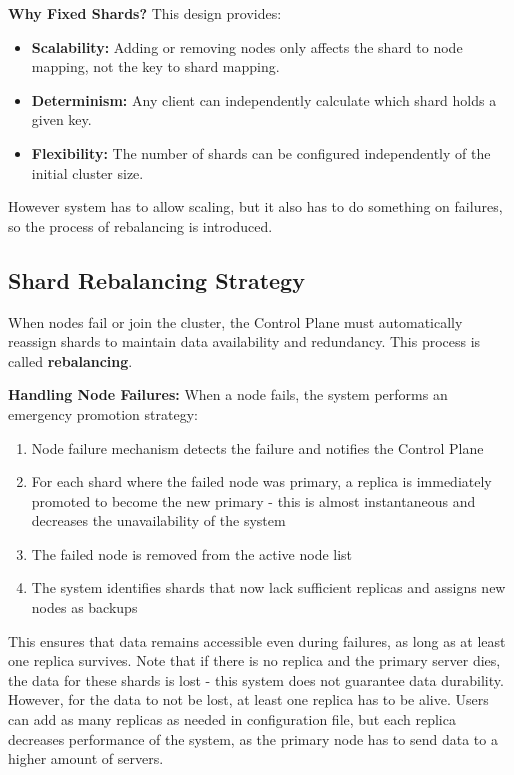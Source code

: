 \documentclass[shortabstract]{iithesis}
\begin{document}
\textbf{Why Fixed Shards?} This design provides:
\begin{itemize}
    \item \textbf{Scalability:} Adding or removing nodes only affects the shard to node mapping, not the key to shard mapping.
    \item \textbf{Determinism:} Any client can independently calculate which shard holds a given key.
    \item \textbf{Flexibility:} The number of shards can be configured independently of the initial cluster size.
\end{itemize}

However system has to allow scaling, but it also has to do something on failures, so the process of rebalancing is introduced.

\subsection{Shard Rebalancing Strategy}

When nodes fail or join the cluster, the Control Plane must automatically reassign shards to maintain data availability and redundancy. This process is called \textbf{rebalancing}.

\textbf{Handling Node Failures:} When a node fails, the system performs an emergency promotion strategy:
\begin{enumerate}
    \item Node failure mechanism detects the failure and notifies the Control Plane
    \item For each shard where the failed node was primary, a replica is immediately promoted to become the new primary - this is almost instantaneous and decreases the unavailability of the system
    \item The failed node is removed from the active node list
    \item The system identifies shards that now lack sufficient replicas and assigns new nodes as backups
\end{enumerate}

This ensures that data remains accessible even during failures, as long as at least one replica survives. Note that if there is no replica and the primary server dies, the data for these shards is lost - this system does not guarantee data durability. However, for the data to not be lost, at least one replica has to be alive. Users can add as many replicas as needed in configuration file, but each replica decreases performance of the system, as the primary node has to send data to a higher amount of servers.
\end{document}
